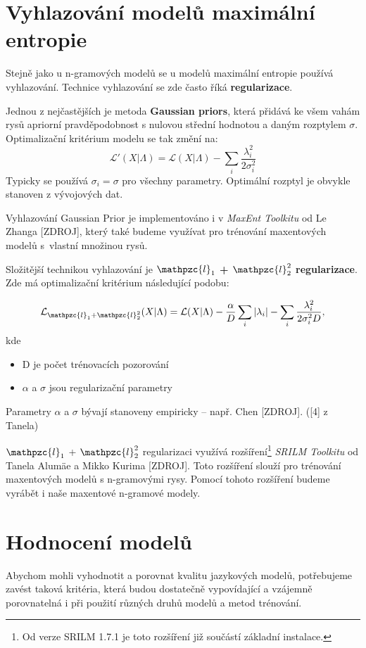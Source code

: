 \documentclass[12pt,a4paper]{report}
\begin{document}
\section{Vyhlazování modelů maximální entropie}

Stejně jako u n-gramových modelů se u modelů maximální entropie používá vyhlazování. Technice vyhlazování se zde často říká \textbf{regularizace}. 

Jednou z nejčastějších je metoda \textbf{Gaussian priors}, která přidává ke všem vahám rysů apriorní pravděpodobnost s nulovou střední hodnotou a daným rozptylem $\sigma$. Optimalizační kritérium modelu se tak změní na:
\begin{equation}
\mathcal{L}'(X|\Lambda) = \mathcal{L}(X|\Lambda) - \sum_i \frac{\lambda_i^2}{2\sigma_i^2}
\end{equation}
Typicky se používá $\sigma_i = \sigma$ pro všechny parametry. Optimální rozptyl je obvykle stanoven z vývojových dat.

Vyhlazování Gaussian Prior je implementováno i v \textit{MaxEnt Toolkitu} od Le Zhanga [ZDROJ], který také budeme využívat pro trénování maxentových modelů s~vlastní množinou rysů.

Složitější technikou vyhlazování je \textbf{$\mathpzc{l}_1$ + $\mathpzc{l}_2^2$ regularizace}. Zde má optimalizační kritérium následující podobu:

\begin{equation}
\mathcal{L}_{\mathpzc{l}_1 + \mathpzc{l}_2^2} (X|\Lambda) = \mathcal{L}(X|\Lambda) - \frac{\alpha}{D} \sum_i |\lambda_i| - \sum_i \frac{\lambda_i^2}{2\sigma_i^2 D},
\end{equation}
kde \begin{itemize}
\item{D je počet trénovacích pozorování}
\item{$\alpha$ a $\sigma$ jsou regularizační parametry}
\end{itemize}

Parametry $\alpha$ a $\sigma$ bývají stanoveny empiricky -- např. Chen [ZDROJ]. ([4] z Tanela)

$\mathpzc{l}_1$ + $\mathpzc{l}_2^2$ regularizaci využívá rozšíření\footnote{Od verze SRILM 1.7.1 je toto rozšíření již součástí základní instalace.} \textit{SRILM Toolkitu} od Tanela Alumäe a Mikko Kurima [ZDROJ]. Toto rozšíření slouží pro trénování maxentových modelů s n-gramovými rysy. Pomocí tohoto rozšíření budeme vyrábět i naše maxentové n-gramové modely.

\section{Hodnocení modelů}
Abychom mohli vyhodnotit a porovnat kvalitu jazykových modelů, potřebujeme zavést taková kritéria, která budou dostatečně vypovídající a vzájemně porovnatelná i při použití různých druhů modelů a metod trénování.
\end{document}

